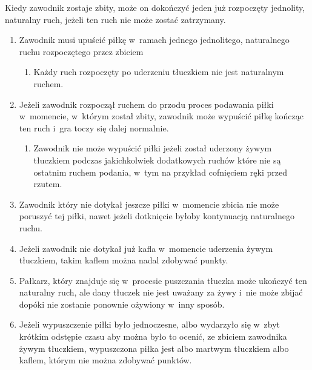 \documentclass[12pt,a4paper]{article}
\renewcommand{\paragraph}[1]{
  \oldparagraph{#1}%
  \leftskip2.8cm
}
\begin{document}
Kiedy zawodnik zostaje zbity, może on dokończyć jeden już rozpoczęty
jednolity, naturalny ruch, jeżeli ten ruch nie może zostać zatrzymany.

\paragraph{Stosuje się następujące warunki:}

\begin{enumerate}
	\item
	      Zawodnik musi upuścić piłkę w~ramach jednego jednolitego, naturalnego
	      ruchu rozpoczętego przez zbiciem

	      \begin{enumerate}
		      \item
		            Każdy ruch rozpoczęty po uderzeniu tłuczkiem nie jest naturalnym
		            ruchem.
	      \end{enumerate}
	\item
	      Jeżeli zawodnik rozpoczął ruchem do przodu proces podawania piłki w~momencie, w~którym został zbity, zawodnik może wypuścić piłkę kończąc
	      ten ruch i~gra toczy się dalej normalnie.

	      \begin{enumerate}
		      \item
		            Zawodnik nie może wypuścić piłki jeżeli został uderzony żywym tłuczkiem
		            podczas jakichkolwiek dodatkowych ruchów które nie są ostatnim
		            ruchem podania, w~tym na przykład cofnięciem ręki przed rzutem.
	      \end{enumerate}
	\item
	      Zawodnik który nie dotykał jeszcze piłki w~momencie zbicia nie może
	      poruszyć tej piłki, nawet jeżeli dotknięcie byłoby kontynuacją
	      naturalnego ruchu.
	\item
	      Jeżeli zawodnik nie dotykał już kafla w~momencie uderzenia żywym
	      tłuczkiem, takim kaflem można nadal zdobywać punkty.
	\item
	      Pałkarz, który znajduje się w~procesie puszczania tłuczka może
	      ukończyć ten naturalny ruch, ale dany tłuczek nie jest uważany za żywy
	      i~nie może zbijać dopóki nie zostanie ponownie ożywiony w~inny sposób.
	\item
	      Jeżeli wypuszczenie piłki było jednoczesne, albo wydarzyło się w~zbyt
	      krótkim odstępie czasu aby można było to ocenić, ze zbiciem zawodnika
	      żywym tłuczkiem, wypuszczona piłka jest albo martwym tłuczkiem albo
	      kaflem, którym nie można zdobywać punktów.
\end{enumerate}
\end{document}
